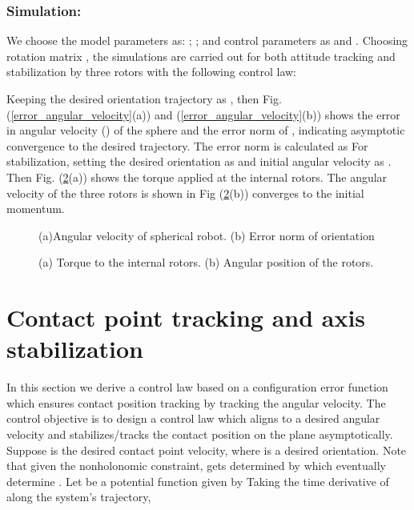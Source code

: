 \documentclass{ifacconf}
\begin{document}
\subsubsection*{Simulation:}
\label{section_simu}
We choose the model parameters as:  ; ;
and control parameters as  and . Choosing rotation matrix , the simulations are carried out for both attitude tracking and stabilization by three rotors with the following control law:
 
Keeping the desired orientation trajectory as , then Fig. (\ref{error_angular_velocity}(a)) and (\ref{error_angular_velocity}(b)) shows the error in angular velocity () of the sphere and the error norm of , indicating asymptotic convergence to the desired trajectory. The error norm is calculated as  
For stabilization, setting the desired orientation as  and initial angular velocity as . Then Fig. (\ref{control}(a)) shows the torque applied at the internal rotors. The angular velocity of the three rotors is shown in Fig (\ref{control}(b)) converges to the initial momentum.
\begin{figure}[h]
		\caption{(a)Angular velocity of spherical robot. (b) Error norm of orientation}				
				\label{angular_velocity}			
\end{figure}
\begin{figure}
		\caption{(a) Torque to the internal rotors. (b) Angular position of the rotors. }				
				\label{control}				
\end{figure}
\section{Contact point tracking and axis stabilization}
In this section we derive a control law based on a configuration error function which ensures contact position tracking by tracking the angular velocity. The control objective is to design a control law which aligns  to a desired angular velocity and stabilizes/tracks the contact position on the plane asymptotically. Suppose  is the desired contact point velocity, where  is a desired orientation. Note that given the nonholonomic constraint,  gets determined by  which eventually determine  . Let  be a potential function given by 
Taking the time derivative of  along the system's trajectory,
\end{document}
